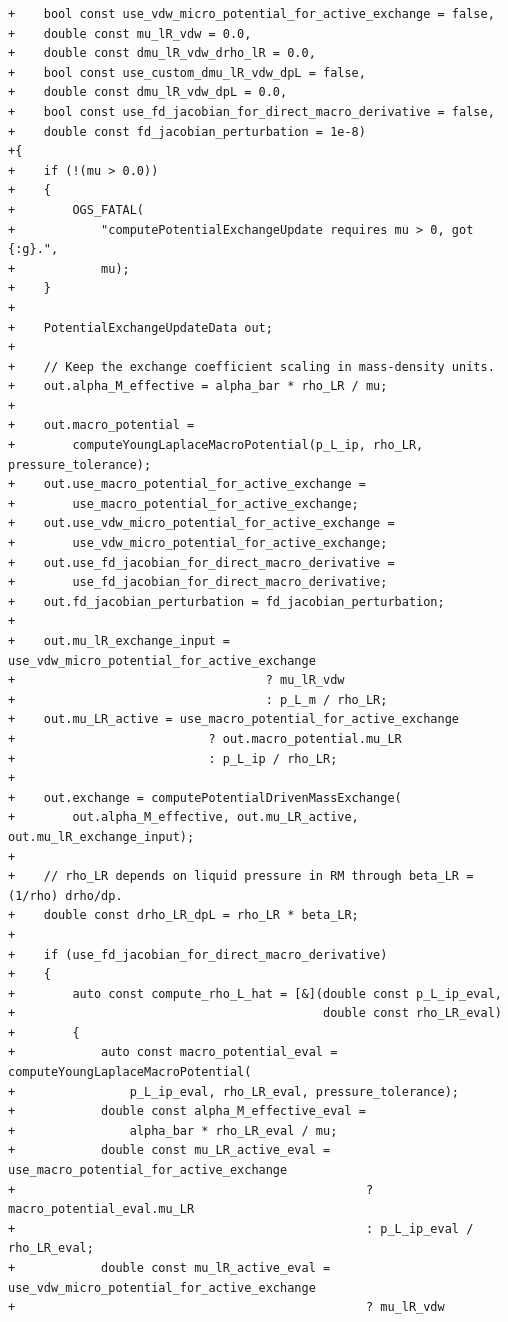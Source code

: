\documentclass[10pt]{article}
\begin{document}
\begin{lstlisting}
+    bool const use_vdw_micro_potential_for_active_exchange = false,
+    double const mu_lR_vdw = 0.0,
+    double const dmu_lR_vdw_drho_lR = 0.0,
+    bool const use_custom_dmu_lR_vdw_dpL = false,
+    double const dmu_lR_vdw_dpL = 0.0,
+    bool const use_fd_jacobian_for_direct_macro_derivative = false,
+    double const fd_jacobian_perturbation = 1e-8)
+{
+    if (!(mu > 0.0))
+    {
+        OGS_FATAL(
+            "computePotentialExchangeUpdate requires mu > 0, got {:g}.",
+            mu);
+    }
+
+    PotentialExchangeUpdateData out;
+
+    // Keep the exchange coefficient scaling in mass-density units.
+    out.alpha_M_effective = alpha_bar * rho_LR / mu;
+
+    out.macro_potential =
+        computeYoungLaplaceMacroPotential(p_L_ip, rho_LR, pressure_tolerance);
+    out.use_macro_potential_for_active_exchange =
+        use_macro_potential_for_active_exchange;
+    out.use_vdw_micro_potential_for_active_exchange =
+        use_vdw_micro_potential_for_active_exchange;
+    out.use_fd_jacobian_for_direct_macro_derivative =
+        use_fd_jacobian_for_direct_macro_derivative;
+    out.fd_jacobian_perturbation = fd_jacobian_perturbation;
+
+    out.mu_lR_exchange_input = use_vdw_micro_potential_for_active_exchange
+                                   ? mu_lR_vdw
+                                   : p_L_m / rho_LR;
+    out.mu_LR_active = use_macro_potential_for_active_exchange
+                           ? out.macro_potential.mu_LR
+                           : p_L_ip / rho_LR;
+
+    out.exchange = computePotentialDrivenMassExchange(
+        out.alpha_M_effective, out.mu_LR_active, out.mu_lR_exchange_input);
+
+    // rho_LR depends on liquid pressure in RM through beta_LR = (1/rho) drho/dp.
+    double const drho_LR_dpL = rho_LR * beta_LR;
+
+    if (use_fd_jacobian_for_direct_macro_derivative)
+    {
+        auto const compute_rho_L_hat = [&](double const p_L_ip_eval,
+                                           double const rho_LR_eval)
+        {
+            auto const macro_potential_eval = computeYoungLaplaceMacroPotential(
+                p_L_ip_eval, rho_LR_eval, pressure_tolerance);
+            double const alpha_M_effective_eval =
+                alpha_bar * rho_LR_eval / mu;
+            double const mu_LR_active_eval = use_macro_potential_for_active_exchange
+                                                 ? macro_potential_eval.mu_LR
+                                                 : p_L_ip_eval / rho_LR_eval;
+            double const mu_lR_active_eval = use_vdw_micro_potential_for_active_exchange
+                                                 ? mu_lR_vdw

\end{lstlisting}
\end{document}
